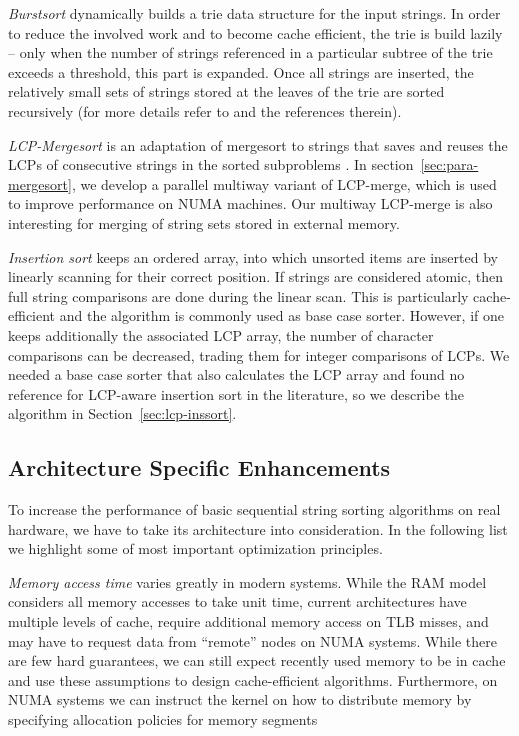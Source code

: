 \documentclass[a4paper]{myjournal}
\begin{document}
\emph{Burstsort} dynamically builds a trie data structure for the input
strings. In order to reduce the involved work and to become cache efficient, the
trie is build lazily -- only when the number of strings referenced in a
particular subtree of the trie exceeds a threshold, this part is expanded. Once
all strings are inserted, the relatively small sets of strings stored at the
leaves of the trie are sorted recursively (for more details refer to
\cite{sinha2004cache-conscious,sinha2007cache-efficient,sinha2010engineering}
and the references therein).

\emph{LCP-Mergesort} is an adaptation of mergesort to strings that saves and
reuses the LCPs of consecutive strings in the sorted subproblems
\cite{ng2008merging}. In section~\ref{sec:para-mergesort}, we develop a parallel
multiway variant of LCP-merge, which is used to improve performance on NUMA
machines. Our multiway LCP-merge is also interesting for merging of
string sets stored in external memory.

\emph{Insertion sort} \cite{knuth1998sorting} keeps an ordered array, into which
unsorted items are inserted by linearly scanning for their correct position. If
strings are considered atomic, then full string comparisons are done during the
linear scan. This is particularly cache-efficient and the algorithm is commonly
used as base case sorter.  However, if one keeps additionally the associated LCP
array, the number of character comparisons can be decreased, trading them for
integer comparisons of LCPs. We needed a base case sorter that also calculates
the LCP array and found no reference for LCP-aware insertion sort in the
literature, so we describe the algorithm in Section~\ref{sec:lcp-inssort}.

\subsection{Architecture Specific Enhancements}

To increase the performance of basic sequential string sorting algorithms on
real hardware, we have to take its architecture into consideration.  In the
following list we highlight some of most important optimization principles.

\emph{Memory access time} varies greatly in modern systems.  While the RAM model
considers all memory accesses to take unit time, current architectures have
multiple levels of cache, require additional memory access on TLB misses, and
may have to request data from ``remote'' nodes on NUMA systems.  While there are
few hard guarantees, we can still expect recently used memory to be in cache and
use these assumptions to design cache-efficient algorithms.  Furthermore, on
NUMA systems we can instruct the kernel on how to distribute memory by
specifying allocation policies for memory segments
\end{document}
